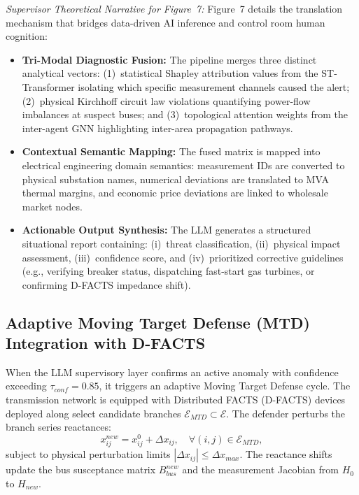 \documentclass[journal,compsoc]{IEEEtran}
\begin{document}
\textit{Supervisor Theoretical Narrative for Figure~7:}
Figure~7 details the translation mechanism that bridges data-driven AI inference and control room human cognition:
\begin{itemize}
    \item \textbf{Tri-Modal Diagnostic Fusion:} The pipeline merges three distinct analytical vectors: (1)~statistical Shapley attribution values from the ST-Transformer isolating which specific measurement channels caused the alert; (2)~physical Kirchhoff circuit law violations quantifying power-flow imbalances at suspect buses; and (3)~topological attention weights from the inter-agent GNN highlighting inter-area propagation pathways.
    \item \textbf{Contextual Semantic Mapping:} The fused matrix is mapped into electrical engineering domain semantics: measurement IDs are converted to physical substation names, numerical deviations are translated to MVA thermal margins, and economic price deviations are linked to wholesale market nodes.
    \item \textbf{Actionable Output Synthesis:} The LLM generates a structured situational report containing: (i)~threat classification, (ii)~physical impact assessment, (iii)~confidence score, and (iv)~prioritized corrective guidelines (e.g., verifying breaker status, dispatching fast-start gas turbines, or confirming D-FACTS impedance shift).
\end{itemize}

\subsection{Adaptive Moving Target Defense (MTD) Integration with D-FACTS}
When the LLM supervisory layer confirms an active anomaly with confidence exceeding $\tau_{conf} = 0.85$, it triggers an adaptive Moving Target Defense cycle. The transmission network is equipped with Distributed FACTS (D-FACTS) devices deployed along select candidate branches $\mathcal{E}_{MTD} \subset \mathcal{E}$. The defender perturbs the branch series reactances:
\begin{equation}
    x_{ij}^{new} = x_{ij}^0 + \Delta x_{ij}, \quad \forall (i, j) \in \mathcal{E}_{MTD},
\end{equation}
subject to physical perturbation limits $|\Delta x_{ij}| \le \Delta x_{max}$. The reactance shifts update the bus susceptance matrix $B_{bus}^{new}$ and the measurement Jacobian from $H_0$ to $H_{new}$.
\end{document}
